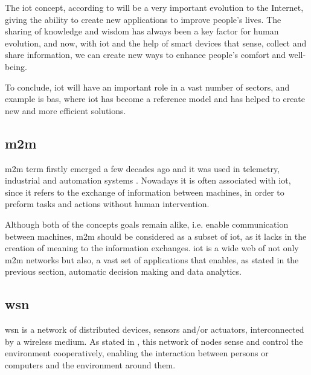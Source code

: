 The \ac{iot} concept, according to \cite{Evans2011} will be a very important evolution to the Internet, giving the ability to create new applications to improve people's lives. The sharing of knowledge and wisdom has always been a key factor for human evolution, and now, with \ac{iot} and the help of smart devices that sense, collect and share information, we can create new ways to enhance people's comfort and well-being.

To conclude, \ac{iot} will have an important role in a vast number of sectors, and example is \ac{bas}, where \ac{iot} has become a reference model and has helped to create new and more efficient solutions.



\subsection{\acf{m2m}}

\acf{m2m} term firstly emerged a few decades ago and it was used in telemetry, industrial and automation systems \cite{}. Nowadays it is often associated with \ac{iot}, since it refers to the exchange of information between machines, in order to preform tasks and actions without human intervention.

Although both of the concepts goals remain alike, i.e. enable communication between machines, \ac{m2m} should be considered as a subset of \ac{iot}, as it lacks in the creation of meaning to the information exchanges. \ac{iot} is a wide web of not only \ac{m2m} networks but also, a vast set of applications that enables, as stated in the previous section, automatic decision making and data analytics. 

\subsection{\acf{wsn}}

\acf{wsn} is a network of distributed devices, sensors and/or actuators, interconnected by a wireless medium. As stated in \cite{IEC2014a}, this network of nodes sense and control the environment cooperatively, enabling the interaction between persons or computers and the environment around them. 


